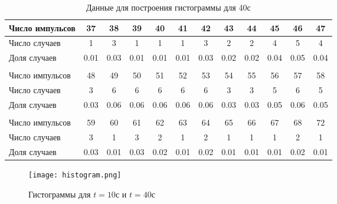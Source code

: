 \documentclass[a4paper, 12pt]{article}
\begin{document}
    \begin{table}[H]
    \begin{center}
    \begin{tabular}{|l|c|c|c|c|c|c|c|c|c|c|c|}\hline
    Число импульсов & 37 & 38 & 39 & 40 & 41 & 42 & 43 & 44 & 45 & 46 & 47 \\\hline
    Число случаев & 1 & 3 & 1 & 1 & 1 & 3 & 2 & 2 & 4 & 5 & 4 \\\hline
    Доля случаев & 0.01 & 0.03 & 0.01 & 0.01 & 0.01 & 0.03 & 0.02 & 0.02 & 0.04 & 0.05 & 0.04 \\\hline
    \multicolumn{9}{c}{}\\\hline
    Число импульсов & 48 & 49 & 50 & 51 & 52 & 53 & 54 & 55 & 56 & 57 & 58 \\\hline
    Число случаев & 3 & 6 & 6 & 6 & 6 & 6 & 3 & 3 & 5 & 6 & 5 \\\hline
    Доля случаев & 0.03 & 0.06 & 0.06 & 0.06 & 0.06 & 0.06 & 0.03 & 0.03 & 0.05 & 0.06 & 0.05 \\\hline
    \multicolumn{9}{c}{}\\\hline
    Число импульсов & 59 & 60 & 61 & 62 & 63 & 64 & 65 & 66 & 67 & 68 & 72 \\\hline
    Число случаев & 3 & 1 & 3 & 2 & 1 & 2 & 1 & 1 & 1 & 2 & 1 \\\hline
    Доля случаев & 0.03 & 0.01 & 0.03 & 0.02 & 0.01 & 0.02 & 0.01 & 0.01 & 0.01 & 0.02 & 0.01 \\\hline
    \end{tabular}
    \caption{Данные для построения гистограммы для 40с}
    \end{center}
    \end{table}
    \newpage

    \begin{sidewaysfigure}
        \texttt{[image: histogram.png]}
        \caption{Гистограммы для $t=10с$ и $t=40с$}
    \end{sidewaysfigure}
\end{document}
